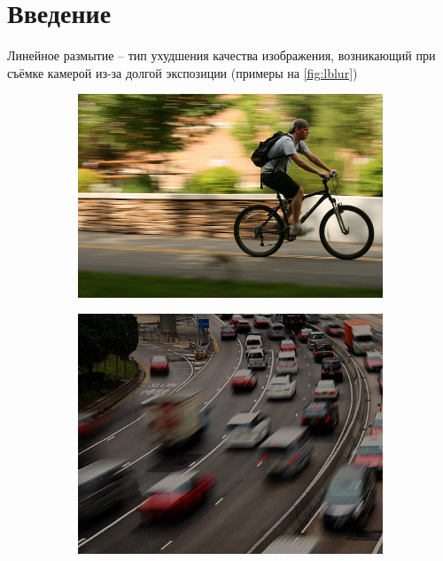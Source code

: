 

\usepackage{comment}





\tableofcontents

\newpage

\pagestyle{fancy}

\rhead{\thepage}
\fancyfoot{}

\section{Введение}
Линейное размытие -- тип ухудшения качества изображения, возникающий при съёмке камерой из-за долгой экспозиции (примеры на \ref{fig:lblur})

\begin{figure}[h!]
  \centering
  \begin{subfigure}[b]{0.4\linewidth}
    \includegraphics[width=\linewidth]{pics/linear_motion_blur/bicycle.jpg}
  \end{subfigure}
  \begin{subfigure}[b]{0.4\linewidth}
    \includegraphics[width=\linewidth]{pics/linear_motion_blur/traffic.jpg}

\end{subfigure}
\end{figure}
